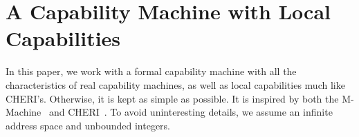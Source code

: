 \documentclass[format=acmsmall, review=true, screen=true]{acmart}
\begin{document}





\section{A Capability Machine with Local Capabilities}
\label{sec:capab-mach-with}
In this paper, we work with a formal capability machine with all the
characteristics of real capability machines, as well as local capabilities much
like CHERI's. Otherwise, it is kept as simple as possible. It is inspired by
both the M-Machine~\citep{Carter:1994:HSF:195473.195579} and
CHERI~\citep{Watson2015Cheri}. To avoid uninteresting details, we assume an
infinite address space and unbounded integers.
\end{document}
